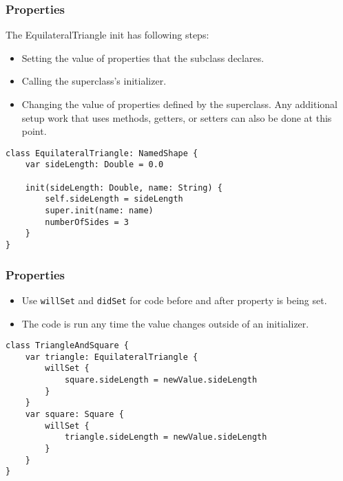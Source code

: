 \begin{frame}[fragile] \frametitle{Properties}

The EquilateralTriangle init has following steps:
\begin{itemize}
\item Setting the value of properties that the subclass declares.
\item Calling the superclass’s initializer.
\item Changing the value of properties defined by the superclass. Any additional setup work that uses methods, getters, or setters can also be done at this point.
\end{itemize}

\begin{lstlisting}
class EquilateralTriangle: NamedShape {
    var sideLength: Double = 0.0

    init(sideLength: Double, name: String) {
        self.sideLength = sideLength
        super.init(name: name)
        numberOfSides = 3
    }
}
\end{lstlisting}

\end{frame}

\begin{frame}[fragile] \frametitle{Properties}

\begin{itemize}
\item Use \lstinline|willSet| and \lstinline|didSet| for code before and after property is being set.
\item The code is run any time the value changes outside of an initializer.
\end{itemize}

\begin{lstlisting}
class TriangleAndSquare {
    var triangle: EquilateralTriangle {
        willSet {
            square.sideLength = newValue.sideLength
        }
    }
    var square: Square {
        willSet {
            triangle.sideLength = newValue.sideLength
        }
    }
}
\end{lstlisting}
\end{frame}


